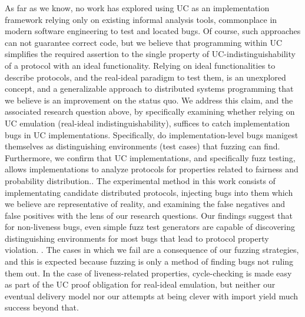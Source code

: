 As far as we know, no work has explored using UC as an implementation framework
relying only on existing informal analysis tools, commonplace in modern
software engineering to test and located bugs.  Of course, such approaches can
not guarantee correct code, but we believe that programming within UC
simplifies the required assertion to the single property of
UC-indistinguishability of a protocol with an ideal functionality.  Relying on
ideal functionalities to describe protocols, and the real-ideal paradigm to
test them, is an unexplored concept, and a generalizable approach to
distributed systems programming that we believe is an improvement on the status
quo.  We address this claim, and the associated research question above, by
specifically examining whether relying on UC emulation (real-ideal
indistinguishability), suffices to catch implementation bugs in UC
implementations.  Specifically, do implementation-level bugs manigest
themselves as distinguishing environments (test cases) that fuzzing can find.
Furthermore, we confirm that UC implementations, and specifically fuzz testing,
allows implementations to analyze protocols for properties related to fairness
and probability distribution..  The
experimental method in this work consists of implementating candidate
distributed protocols, injecting bugs into them which we believe are
representative of reality, and examining the false negatives and false
positives with the lens of our research questions.  Our findings suggest that
for non-liveness bugs, even simple fuzz test generators are capable of
discovering distinguishing environments for most bugs that lead to protocol
property violation.  .   The cases in which we fail are a consequence
of our fuzzing strategies, and this is expected because fuzzing is only a
method of finding bugs not ruling them out.  In the case of liveness-related
properties, cycle-checking is made easy as part of the UC proof obligation for
real-ideal emulation, but neither our eventual delivery model nor our attempts
at being clever with import yield much success beyond that. 

